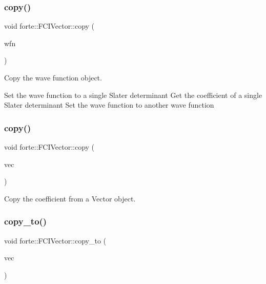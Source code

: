 \subsubsection{\texorpdfstring{copy()}{copy()}\hspace{0.1cm}{\footnotesize\ttfamily [1/2]}}
{\footnotesize\ttfamily void forte\+::\+F\+C\+I\+Vector\+::copy (\begin{DoxyParamCaption}\item[{\mbox{\hyperlink{classforte_1_1_f_c_i_vector}{F\+C\+I\+Vector}} \&}]{wfn }\end{DoxyParamCaption})}



Copy the wave function object. 

Set the wave function to a single Slater determinant Get the coefficient of a single Slater determinant Set the wave function to another wave function \mbox{\label{classforte_1_1_f_c_i_vector_a131ea2c22528308ec890b45c9fed78a3}} 
\subsubsection{\texorpdfstring{copy()}{copy()}\hspace{0.1cm}{\footnotesize\ttfamily [2/2]}}
{\footnotesize\ttfamily void forte\+::\+F\+C\+I\+Vector\+::copy (\begin{DoxyParamCaption}\item[{std\+::shared\+\_\+ptr$<$ psi\+::\+Vector $>$}]{vec }\end{DoxyParamCaption})}



Copy the coefficient from a Vector object. 

\mbox{\label{classforte_1_1_f_c_i_vector_af77aa0955826ad3c3588ee4f9a93bad9}} 
\subsubsection{\texorpdfstring{copy\+\_\+to()}{copy\_to()}}
{\footnotesize\ttfamily void forte\+::\+F\+C\+I\+Vector\+::copy\+\_\+to (\begin{DoxyParamCaption}\item[{std\+::shared\+\_\+ptr$<$ psi\+::\+Vector $>$}]{vec }\end{DoxyParamCaption})}




